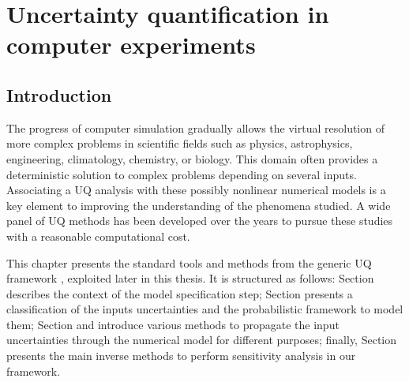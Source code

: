 \chapter{Uncertainty quantification in computer experiments}
\hfill
\localtableofcontents
\newpage

\section{Introduction}\label{sec:}

The progress of computer simulation gradually allows the virtual resolution of more complex problems in scientific fields such as physics, astrophysics, engineering, climatology, chemistry, or biology.
This domain often provides a deterministic solution to complex problems depending on several inputs. 
Associating a UQ analysis with these possibly nonlinear numerical models is a key element to improving the understanding of the phenomena studied. 
A wide panel of UQ methods has been developed over the years to pursue these studies with a reasonable computational cost. 

This chapter presents the standard tools and methods from the generic UQ framework \citet{sullivan_2015}, exploited later in this thesis. 
It is structured as follows: Section  describes the context of the model specification step; 
Section  presents a classification of the inputs uncertainties and the probabilistic framework to model them; 
Section  and  introduce various methods to propagate the input uncertainties through the numerical model for different purposes;
finally, Section  presents the main inverse methods to perform sensitivity analysis in our framework.


